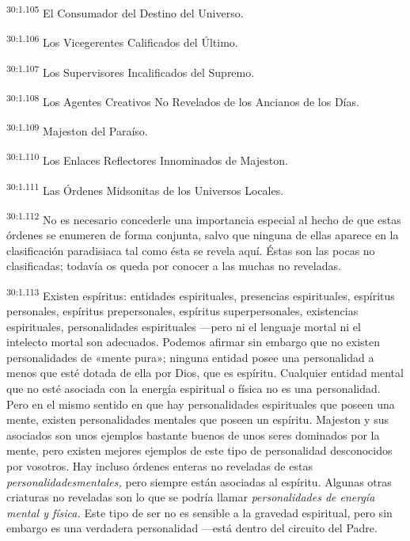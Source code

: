 \par
\textsuperscript{30:1.105} El Consumador del Destino del Universo.

\par
\textsuperscript{30:1.106} Los Vicegerentes Calificados del Último.

\par
\textsuperscript{30:1.107} Los Supervisores Incalificados del Supremo.

\par
\textsuperscript{30:1.108} Los Agentes Creativos No Revelados de los Ancianos de los Días.

\par
\textsuperscript{30:1.109} Majeston del Paraíso.

\par
\textsuperscript{30:1.110} Los Enlaces Reflectores Innominados de Majeston.

\par
\textsuperscript{30:1.111} Las Órdenes Midsonitas de los Universos Locales.

\par
\textsuperscript{30:1.112} No es necesario concederle una importancia especial al hecho de que estas órdenes se enumeren de forma conjunta, salvo que ninguna de ellas aparece en la clasificación paradisiaca tal como ésta se revela aquí. Éstas son las pocas no clasificadas; todavía os queda por conocer a las muchas no reveladas.

\par
\textsuperscript{30:1.113} Existen espíritus: entidades espirituales, presencias espirituales, espíritus personales, espíritus prepersonales, espíritus superpersonales, existencias espirituales, personalidades espirituales ---pero ni el lenguaje mortal ni el intelecto mortal son adecuados. Podemos afirmar sin embargo que no existen personalidades de «mente pura»; ninguna entidad posee una personalidad a menos que esté dotada de ella por Dios, que es espíritu. Cualquier entidad mental que no esté asociada con la energía espiritual o física no es una personalidad. Pero en el mismo sentido en que hay personalidades espirituales que poseen una mente, existen personalidades mentales que poseen un espíritu. Majeston y sus asociados son unos ejemplos bastante buenos de unos seres dominados por la mente, pero existen mejores ejemplos de este tipo de personalidad desconocidos por vosotros. Hay incluso órdenes enteras no reveladas de estas \textit{personalidadesmentales,} pero siempre están asociadas al espíritu. Algunas otras criaturas no reveladas son lo que se podría llamar \textit{personalidades de energía mental y física.} Este tipo de ser no es sensible a la gravedad espiritual, pero sin embargo es una verdadera personalidad ---está dentro del circuito del Padre.

